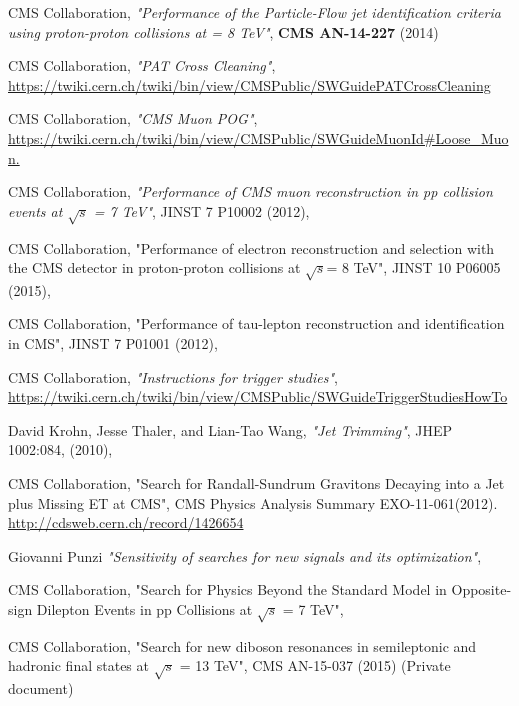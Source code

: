 \documentclass[a4paper,12pt,oneside]{report}
\begin{document}
\begin{thebibliography}{9}
CMS Collaboration,
\emph{"Performance of the Particle-Flow jet identification criteria
using proton-proton collisions at = 8 TeV"},
\textbf{CMS AN-14-227} (2014)

CMS Collaboration,
\emph{"PAT Cross Cleaning"},
\url{https://twiki.cern.ch/twiki/bin/view/CMSPublic/SWGuidePATCrossCleaning} 

CMS Collaboration,
\emph{"CMS Muon POG"},
\url{https://twiki.cern.ch/twiki/bin/view/CMSPublic/SWGuideMuonId#Loose_Muon.}

CMS Collaboration,
\emph{"Performance of CMS muon reconstruction in pp collision events at $\sqrt{s}$ = 7 TeV"},
JINST 7 P10002 (2012),

CMS Collaboration,
"Performance of electron reconstruction and selection with the CMS detector in proton-proton collisions at $\sqrt{s}$= 8 TeV",
JINST 10 P06005 (2015),

CMS Collaboration,
"Performance of tau-lepton reconstruction and identification in CMS",
JINST 7 P01001 (2012),

CMS Collaboration,
\emph{"Instructions for trigger studies"},
\url{https://twiki.cern.ch/twiki/bin/view/CMSPublic/SWGuideTriggerStudiesHowTo}

David Krohn, Jesse Thaler, and Lian-Tao Wang, 
\emph{"Jet Trimming"},
JHEP 1002:084, (2010), 

CMS Collaboration,
"Search for Randall-Sundrum Gravitons Decaying into
a Jet plus Missing ET at CMS",
CMS Physics Analysis Summary EXO-11-061(2012). \url{http://cdsweb.cern.ch/record/1426654}
 
Giovanni Punzi   
\emph{"Sensitivity of searches for new signals and its optimization"},

CMS Collaboration,
"Search for Physics Beyond the Standard Model in
Opposite-sign Dilepton Events in pp Collisions at
$\sqrt{s}$ = 7 TeV",

CMS Collaboration,
"Search for new diboson resonances in semileptonic and
hadronic final states at $\sqrt{s}$ = 13 TeV",
CMS AN-15-037 (2015) (Private document)



    
\end{thebibliography}
\end{document}
